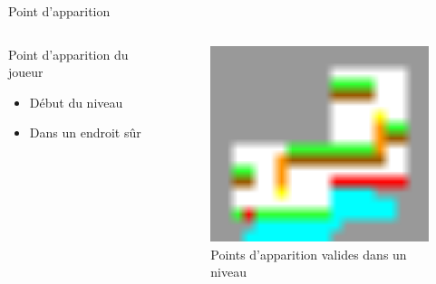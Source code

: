 \documentclass{beamer}
\begin{document}
{\begin{frame}{Point d'apparition}
    \begin{columns}
        \begin{block}{Point d'apparition du joueur}
            \begin{itemize}
                \item[\bullet] Début du niveau
                \item[\bullet] Dans un endroit sûr
            \end{itemize}
        \end{block}
        \begin{figure}
            \centering
            \includegraphics[width=1.0\textwidth]{valid_spawn_locations}
            \caption{Points d'apparition valides dans un niveau}
        \end{figure}
    \end{columns}
\end{frame}

}
\end{document}
